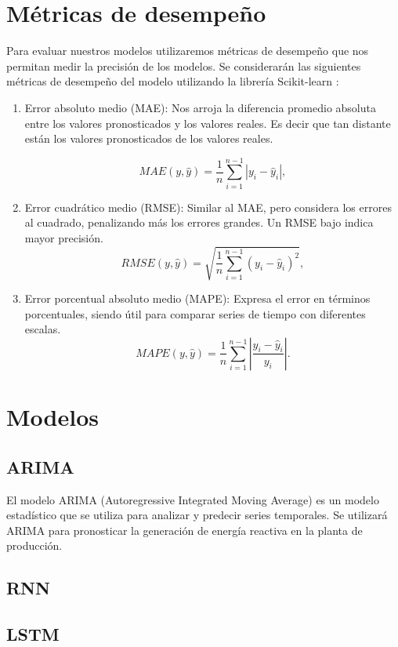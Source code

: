 \section{M\'etricas de desempe\~no}

Para evaluar nuestros modelos utilizaremos m\'etricas de desempe\~no que nos permitan medir la precisi\'on de los modelos.
Se considerar\'an las siguientes m\'etricas de desempe\~no del modelo utilizando la librer\'ia Scikit-learn \cite{ScikitMetrics}:  

\begin{enumerate}
    \item Error absoluto medio (MAE): Nos arroja la diferencia promedio absoluta entre los valores 
    pronosticados y los valores reales. Es decir que tan distante est\'an los valores pronosticados 
    de los valores reales.
    
     \begin{equation}
        MAE(y,\hat{y}) = \frac{1}{n} \sum_{i=1}^{n-1} |y_i - \hat{y}_i|,
    \end{equation}
    \item Error cuadr\'atico medio (RMSE): Similar al MAE, pero considera los errores al cuadrado, penalizando m\'as los errores grandes. Un RMSE bajo indica mayor precisi\'on.
        \begin{equation}
            RMSE(y,\hat{y}) = \sqrt{\frac{1}{n} \sum_{i=1}^{n-1} (y_i - \hat{y}_i)^2},
    \end{equation}
    \item Error porcentual absoluto medio (MAPE): Expresa el error en t\'erminos porcentuales, siendo \'util para comparar series de tiempo con diferentes escalas.
    \begin{equation}
        MAPE(y,\hat{y}) = \frac{1}{n} \sum_{i=1}^{n-1} \left| \frac{y_i - \hat{y}_i}{y_i} \right|.
    \end{equation}

\end{enumerate}



\section{Modelos}

\subsection{ARIMA}

El modelo ARIMA (Autoregressive Integrated Moving Average) es un modelo estad\'istico que se utiliza para analizar y predecir series temporales. 
Se utilizar\'a ARIMA para pronosticar la generaci\'on de energ\'ia reactiva en la planta de producci\'on.

\subsection{RNN}

\subsection{LSTM}